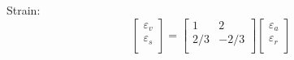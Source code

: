 \documentclass[notes]{beamer}
\begin{document}
\begin{frame}
Strain:
\begin{equation}
	\begin{bmatrix}
		\varepsilon_v \\
		\varepsilon_s \\
	\end{bmatrix}%
	=%
	\begin{bmatrix}
		1   &  2\\
		2/3   & -2/3\\
	\end{bmatrix}%
	\begin{bmatrix}
		\varepsilon_a \\
		\varepsilon_r \\
	\end{bmatrix}%
	\label{eq:strain-strain}
\end{equation}
\end{frame}
\end{document}
